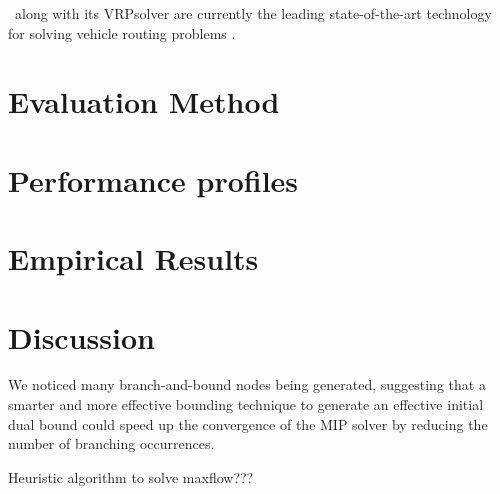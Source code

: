 \bapcod\ along with its VRPsolver are currently the leading state-of-the-art
technology for solving vehicle routing problems \parencite{pessoa2020a}.

\section{Evaluation Method}
\label{sec:results-evaluation-method}

\section{Performance profiles}
\label{sec:results-performance-profiles}


\section{Empirical Results}
\label{sec:results-empirical-results}

\section{Discussion}
\label{sec:results-discussion}

We noticed many branch-and-bound nodes being generated,
suggesting that a smarter and more effective bounding technique to
generate an effective initial dual bound could speed up the convergence
of the MIP solver by reducing the number of branching occurrences.

Heuristic algorithm to solve maxflow???
